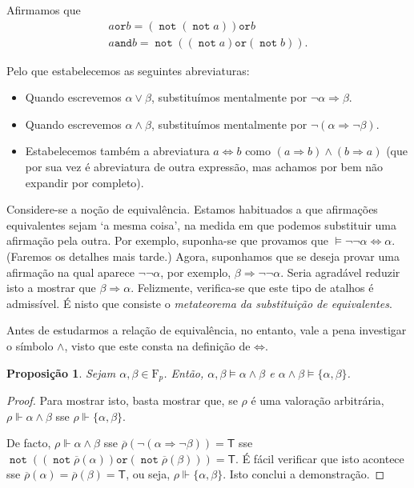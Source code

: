 \documentclass{report}
\newtheorem{prop}{Proposição}
\theoremstyle{definition}
\theoremstyle{remark}
\newcommand{\F}{\mathrm{F}}
\newcommand{\lt}{\mathsf{T}}
\DeclareMathOperator{\pnot}{\texttt{not}}
\newcommand{\pand}{\mathbin{\texttt{and}}}
\newcommand{\por}{\mathbin{\texttt{or}}}
\newcommand{\imply}{\mathbin{\Rightarrow}}
\newcommand{\eqv}{\mathbin{\Leftrightarrow}}
\begin{document}
	Afirmamos que
	\begin{gather*}
	a \por b = (\pnot (\pnot a)) \por b\\
	a \pand b = \pnot ((\pnot a) \por (\pnot b)).
	\end{gather*}
	
	Pelo que estabelecemos as seguintes abreviaturas:
	
	\begin{itemize}
	\item Quando escrevemos $\alpha \lor \beta$, substituímos mentalmente por $\neg \alpha \imply \beta$.
	
	\item Quando escrevemos $\alpha \land \beta$, substituímos mentalmente por $\neg (\alpha \imply \neg \beta)$.
	
	\item Estabelecemos também a abreviatura $a \eqv b$ como $(a \imply b) \land (b \imply a)$ (que por sua vez é abreviatura de outra expressão, mas achamos por bem não expandir por completo).
	\end{itemize}
	
	Considere-se a noção de equivalência. Estamos habituados a que afirmações equivalentes sejam `a mesma coisa', na medida em que podemos substituir uma afirmação pela outra. Por exemplo, suponha-se que provamos que $\vDash \neg \neg \alpha \eqv \alpha$. (Faremos os detalhes mais tarde.) Agora, suponhamos que se deseja provar uma afirmação na qual aparece $\neg \neg \alpha$, por exemplo, $\beta \imply \neg \neg \alpha$. Seria agradável reduzir isto a mostrar que $\beta \imply \alpha$. Felizmente, verifica-se que este tipo de atalhos é admissível. É nisto que consiste o \emph{metateorema da substituição de equivalentes}.
	
	Antes de estudarmos a relação de equivalência, no entanto, vale a pena investigar o símbolo $\land$, visto que este consta na definição de $\eqv$.
	
	\begin{prop}\label{prop:conj:prop:sem}
	Sejam $\alpha, \beta \in \F_p$. Então, $\alpha, \beta \vDash \alpha \land \beta$ e $\alpha \land \beta \vDash \{\alpha, \beta\}$.
	\end{prop}
	
	\begin{proof}
	Para mostrar isto, basta mostrar que, se $\rho$ é uma valoração arbitrária, $\rho \Vdash \alpha \land \beta$ sse $\rho \Vdash \{\alpha, \beta\}$.
	
	De facto, $\rho \Vdash \alpha \land \beta$ sse $\overline\rho(\neg(\alpha \imply \neg \beta)) = \lt$ sse $\pnot ((\pnot \overline\rho(\alpha)) \por (\pnot \overline\rho(\beta))) = \lt$. É fácil verificar que isto acontece sse $\overline\rho(\alpha) = \overline\rho(\beta) = \lt$, ou seja, $\rho \Vdash \{\alpha, \beta\}$. Isto conclui a demonstração.
	\end{proof}
	
\end{document}
